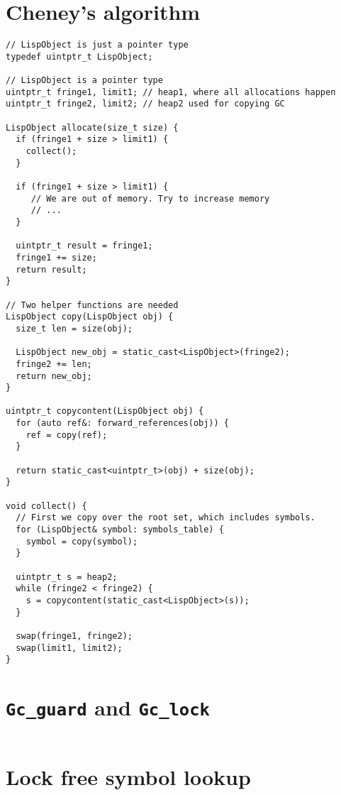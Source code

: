 \section{Cheney's algorithm}
\label{sec:cheneycode}

\begin{verbatim}
// LispObject is just a pointer type
typedef uintptr_t LispObject;

// LispObject is a pointer type
uintptr_t fringe1, limit1; // heap1, where all allocations happen
uintptr_t fringe2, limit2; // heap2 used for copying GC

LispObject allocate(size_t size) {
  if (fringe1 + size > limit1) {
    collect();
  }

  if (fringe1 + size > limit1) {
     // We are out of memory. Try to increase memory
     // ...
  }

  uintptr_t result = fringe1;
  fringe1 += size;
  return result;
}

// Two helper functions are needed
LispObject copy(LispObject obj) {
  size_t len = size(obj);

  LispObject new_obj = static_cast<LispObject>(fringe2);
  fringe2 += len;
  return new_obj;
}

uintptr_t copycontent(LispObject obj) {
  for (auto ref&: forward_references(obj)) {
    ref = copy(ref);
  }

  return static_cast<uintptr_t>(obj) + size(obj);
}

void collect() {
  // First we copy over the root set, which includes symbols.
  for (LispObject& symbol: symbols_table) {
    symbol = copy(symbol);
  }

  uintptr_t s = heap2;
  while (fringe2 < fringe2) {
    s = copycontent(static_cast<LispObject>(s));
  }

  swap(fringe1, fringe2);
  swap(limit1, limit2);
}
\end{verbatim}

\section{\texttt{Gc\_guard} and \texttt{Gc\_lock}}
\label{sec:gclock-code}

\begin{verbatim}

\end{verbatim}

\section{Lock free symbol lookup}
\label{sec:lockfree-code}
